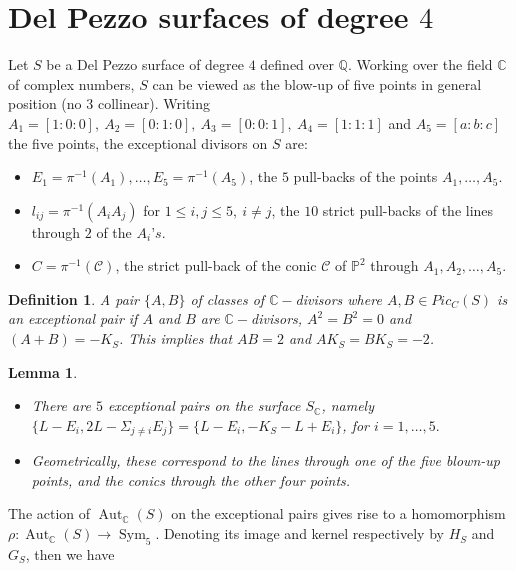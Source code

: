 \documentclass[leqno,12pt]{amsart} %
\newtheorem{lem}[thm]{Lemma}
\newtheorem{defi}[thm]{Definition}
\newcommand{\Q}{\ensuremath{\mathbb{Q} }}
\newcommand{\C}{\ensuremath{\mathbb{C} }}
\newcommand{\p}{\ensuremath{\mathbb{P} }}
\DeclareMathOperator{\Aut}{Aut}
\DeclareMathOperator{\sym}{Sym}
\begin{document}
  \section{\texorpdfstring{Del Pezzo surfaces of degree $4$}{Del Pezzo surfaces of degree 4}}

Let $S$ be a Del Pezzo surface of degree $4$ defined over $\Q $. Working over the field $\C $ of complex numbers, $S$ can be viewed as the blow-up of five points in general position (no 3 collinear). Writing $A_1 = [1 : 0 : 0],~A_2 = [0 : 1 : 0],~A_3 = [0 : 0 : 1],~
A_4 = [1 : 1 : 1]$ and $A_5 = [a: b: c]$ the five points, the exceptional divisors on $S$ are:
\begin{itemize}
    \item $E_1 = \pi^{-1}(A_1), \ldots ,E_5 = \pi^{-1}(A_5)$, the $5$ pull-backs of the points $A_1,\ldots ,A_5$.
  \item $l_{i j} =  \pi^{-1}(A_i A_j)$ for $1 \le  i, j \le  5,~i\neq j$, the $10$ strict pull-backs of the lines through $2$ of the $A_i’s$.
   \item $C=\pi^{-1}(\mathcal{C})$, the strict pull-back of the conic $\mathcal{C}$ of $\p^2$ through $A_1,A_2, \ldots ,A_5$.
\end{itemize}
\begin{defi}\label{def-16}
   A pair $\{A, B\}$ of classes of $\C-$divisors where $A,B \in Pic_C(S)$ is an exceptional pair if $A$ and $B$ are $\C -$divisors, $A^2 = B^2 = 0$ and $(A + B) = -K_S$. This implies that $AB = 2$ and $AK_S = BK_S = -2$.
\end{defi}    
\begin{lem}\cite[Lemma $9.11$]{MR2486798}\label{lemm-14}
    \begin{itemize}
        \item There are $5$ exceptional pairs on the surface $S_{\C }$, namely $\{L-E_i, 2L-\Sigma_{j\neq i} E_j\} =\{L-E_i,-K_S-L+E_i\}$, for $i = 1, \ldots , 5.$
 \item Geometrically, these correspond to the lines through one of the five blown-up points, and the conics through the other four points.
    \end{itemize}
\end{lem}   
 
The action of $\Aut_{\C }(S)$ on the exceptional pairs gives rise to a homomorphism
$\rho : \Aut_{\C }(S) \rightarrow \sym_5$. Denoting its image and kernel respectively by $H_S$ and $G_S$, then we have 
 
\end{document}
